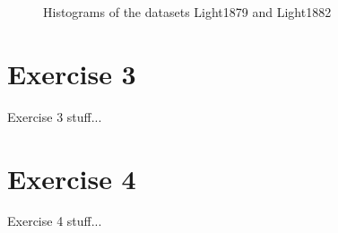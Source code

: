 \documentclass{article}
\begin{document}
    \begin{figure}
      \caption{Histograms of the datasets Light1879 and Light1882}
      \label{fig:HistEx2}
    \end{figure}

  \section{Exercise 3}
    Exercise 3 stuff...

  \section{Exercise 4}
    Exercise 4 stuff...
\end{document}
